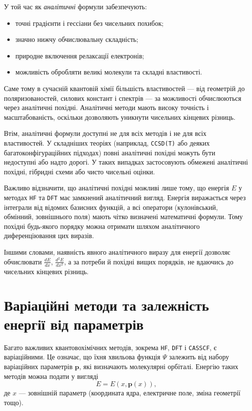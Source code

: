 \documentclass{PySCFBook}
\begin{document}
У той час як \emph{аналітичні} формули забезпечують:
\begin{itemize}
	\item точні градієнти і гессіани без чисельних похибок;
	\item значно нижчу обчислювальну складність;
	\item природне включення релаксації електронів;
	\item можливість обробляти великі молекули та складні властивості.
\end{itemize}

Саме тому в сучасній квантовій хімії більшість властивостей ---
від геометрій до поляризованостей, силових констант і спектрів ---
за можливості обчислюються через аналітичні похідні.
Аналітичні методи мають високу точність і масштабованість,
оскільки дозволяють уникнути чисельних кінцевих різниць.

Втім, аналітичні формули доступні не для всіх методів і не для всіх
властивостей. У складніших теоріях (наприклад, \texttt{CCSD(T)} або
деяких багатоконфігураційних підходах) повні аналітичні похідні можуть
бути недоступні або надто дорогі.
У таких випадках застосовують обмежені аналітичні похідні, гібридні
схеми або чисто чисельні оцінки.


Важливо відзначити, що аналітичні похідні можливі лише тому, що
енергія $E$ у методах \texttt{HF} та \texttt{DFT} має
замкнений аналітичний вигляд.
Енергія виражається через інтеграли від відомих базисних функцій,
а всі оператори (кулонівський, обмінний, зовнішнього поля) мають
чітко визначені математичні формули.
Тому похідні будь-якого порядку можна отримати шляхом
аналітичного диференціювання цих виразів.

Іншими словами,
наявність явного аналітичного виразу для енергії дозволяє
обчислювати $\frac{dE}{dx}$, $\frac{d^2E}{dx^2}$,
а за потреби й похідні вищих порядків,
не вдаючись до чисельних кінцевих різниць.


\section{Варіаційні методи та залежність енергії від параметрів}

Багато важливих квантовохімічних методів, зокрема
\texttt{HF}, \texttt{DFT} і \texttt{CASSCF}, є варіаційними.
Це означає, що їхня хвильова функція $\Psi$ залежить від набору
варіаційних параметрів $\mathbf p$, які визначають молекулярні орбіталі.
Енергію таких методів можна подати у вигляді
\begin{equation}\label{eq:E_x_p}
E = E(x, \mathbf p(x)),
\end{equation}
де $x$ --- зовнішній параметр (координата ядра, електричне поле,
зміна геометрії тощо).
\end{document}
